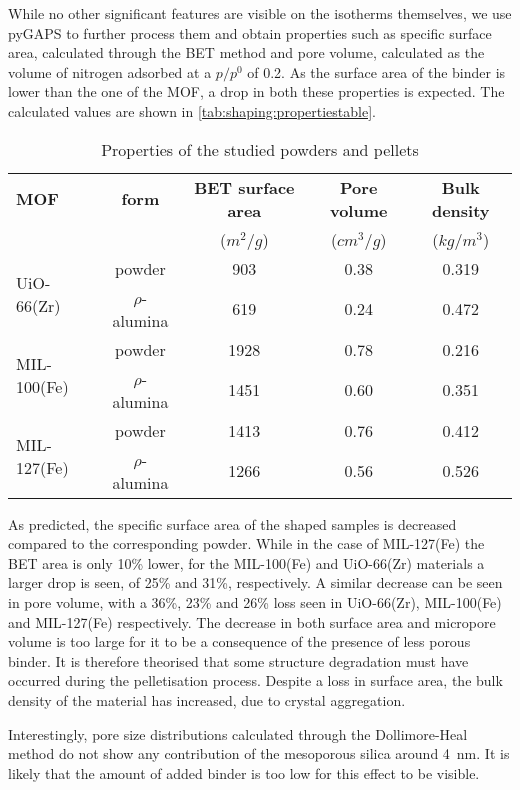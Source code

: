 While no other significant features are visible on the isotherms themselves,
we use pyGAPS to further process them and obtain properties
such as specific surface area, calculated through the BET method and pore
volume, calculated as the volume of nitrogen
adsorbed at a \(p/p^0\) of 0.2.
As the surface area of the binder is lower than the
one of the MOF, a drop in both these properties is expected.
The calculated values are shown in
\autoref{tab:shaping:propertiestable}.

\begin{table}[htb]
	\centering
	\caption{Properties of the studied powders and pellets}
	\begin{tabular}{lcccc}
		\toprule
		\textbf{MOF}
		                             & \textbf{form}
		                             & \textbf{BET surface area}
		                             & \textbf{Pore volume}
		                             & \textbf{Bulk density}                                                 \\
		                             &                           & (\(m^2/g\)) & (\(cm^3/g\)) & (\(kg/m^3\)) \\
		\midrule
		\multirow{2}{*}{UiO-66(Zr)}  & powder                    & 903         & 0.38         & 0.319        \\
		                             & \(\rho\)-alumina          & 619         & 0.24         & 0.472        \\
		\multirow{2}{*}{MIL-100(Fe)} & powder                    & 1928        & 0.78         & 0.216        \\
		                             & \(\rho\)-alumina          & 1451        & 0.60         & 0.351        \\
		\multirow{2}{*}{MIL-127(Fe)} & powder                    & 1413        & 0.76         & 0.412        \\
		                             & \(\rho\)-alumina          & 1266        & 0.56         & 0.526        \\
		\bottomrule
	\end{tabular}%
	\label{tab:shaping:propertiestable}
\end{table}%

As predicted, the specific surface area of the shaped samples is
decreased compared to the corresponding powder. While in the case
of MIL-127(Fe) the BET area is only 10\% lower, for the MIL-100(Fe)
and UiO-66(Zr) materials a larger drop is seen, of 25\% and 31\%,
respectively.
A similar decrease can be seen in pore volume,
with a 36\%, 23\% and 26\% loss seen
in UiO-66(Zr), MIL-100(Fe) and MIL-127(Fe) respectively.
The decrease in both surface area and micropore volume is
too large for it to be a consequence of the presence of less porous binder.
It is therefore theorised that some structure degradation must have
occurred during the pelletisation process.
Despite a loss in surface area, the bulk density of the material
has increased, due to crystal aggregation.

Interestingly, pore size distributions calculated through the 
Dollimore-Heal method do not show any contribution of the mesoporous 
silica around \SI{4}{\nano\metre}. It is likely that the 
amount of added binder is too low for this effect to be 
visible.
